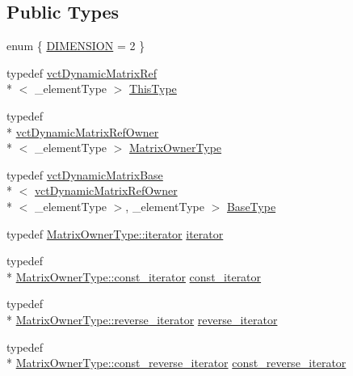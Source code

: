 \subsection*{Public Types}
\begin{DoxyCompactItemize}
\item 
enum \{ \hyperlink{classvct_dynamic_matrix_ref_a296ccb28efb27cc7c51864f9e81b77eca26570951ef99650f548cdec008ae4444}{D\-I\-M\-E\-N\-S\-I\-O\-N} = 2
 \}
\item 
typedef \hyperlink{classvct_dynamic_matrix_ref}{vct\-Dynamic\-Matrix\-Ref}\\*
$<$ \-\_\-element\-Type $>$ \hyperlink{classvct_dynamic_matrix_ref_ac01200e3df0afe95f5d3948da84c8551}{This\-Type}
\item 
typedef \\*
\hyperlink{classvct_dynamic_matrix_ref_owner}{vct\-Dynamic\-Matrix\-Ref\-Owner}\\*
$<$ \-\_\-element\-Type $>$ \hyperlink{classvct_dynamic_matrix_ref_a24cb066b24bdc74c68af35e7c88f8a07}{Matrix\-Owner\-Type}
\item 
typedef \hyperlink{classvct_dynamic_matrix_base}{vct\-Dynamic\-Matrix\-Base}\\*
$<$ \hyperlink{classvct_dynamic_matrix_ref_owner}{vct\-Dynamic\-Matrix\-Ref\-Owner}\\*
$<$ \-\_\-element\-Type $>$, \-\_\-element\-Type $>$ \hyperlink{classvct_dynamic_matrix_ref_a043cfda592e3e7fbca034c09aed3438b}{Base\-Type}
\item 
typedef \hyperlink{classvct_dynamic_matrix_ref_owner_aaf9f6aaf86c05aec0bcd354d40c11863}{Matrix\-Owner\-Type\-::iterator} \hyperlink{classvct_dynamic_matrix_ref_a96cb0ad0104a135e19f1e39567a16ef2}{iterator}
\item 
typedef \\*
\hyperlink{classvct_dynamic_matrix_ref_owner_a7a8df19473cc2e95e25c4d1bf4bacbe4}{Matrix\-Owner\-Type\-::const\-\_\-iterator} \hyperlink{classvct_dynamic_matrix_ref_a6a0340b4b42746edc27c8220cf44afd8}{const\-\_\-iterator}
\item 
typedef \\*
\hyperlink{classvct_dynamic_matrix_ref_owner_a133b22e9f6b4e7a20998ad3db72ed6c3}{Matrix\-Owner\-Type\-::reverse\-\_\-iterator} \hyperlink{classvct_dynamic_matrix_ref_ad797e9f33fe82864e8df2c8c6a30b383}{reverse\-\_\-iterator}
\item 
typedef \\*
\hyperlink{classvct_dynamic_matrix_ref_owner_a50c3b985899b0d6cb2f9fab9f8305207}{Matrix\-Owner\-Type\-::const\-\_\-reverse\-\_\-iterator} \hyperlink{classvct_dynamic_matrix_ref_a6b38953e6bef46b68d3336829873f48e}{const\-\_\-reverse\-\_\-iterator}
\end{DoxyCompactItemize}
